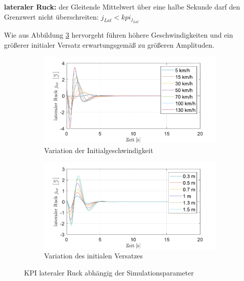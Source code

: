 \medskip\noindent\textbf{lateraler Ruck:} der Gleitende Mittelwert über eine halbe Sekunde darf den Grenzwert nicht überschreiten: $j_{Lat} < kpi_{j_{Lat}}$

\noindent Wie aus Abbildung \ref{fig:Straight_Offset_j-Lat} hervorgeht führen höhere Geschwindigkeiten und ein größerer initialer Versatz erwartungsgemäß zu größeren Amplituden.
\begin{figure}[ht]
    \centering
    \begin{subfigure}[b]{.49\textwidth}
        \centering
        \includegraphics[width=\textwidth]{figures/3_Implementierung/Straight_Offset/varVelo_1mOffset_j-Lat.pdf}
        \caption{Variation der Initialgeschwindigkeit}
        \label{fig:varVelo_1mOffset_j-Lat}
    \end{subfigure}
    \hfill
    \begin{subfigure}[b]{.49\textwidth}
        \centering
        \includegraphics[width=\textwidth]{figures/3_Implementierung/Straight_Offset/varOffset_50kmh_j-Lat.pdf}
        \caption{Variation des initialen Versatzes}
        \label{fig:varOffset_50kmh_j-Lat}
    \end{subfigure}
    \caption{KPI lateraler Ruck abhängig der Simulationsparameter}
    \label{fig:Straight_Offset_j-Lat}
\end{figure}

